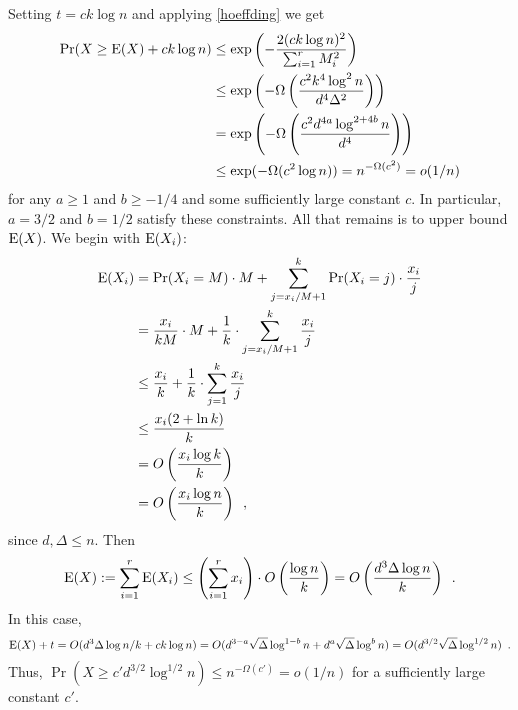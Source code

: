 \documentclass{patmorin}
\begin{document}

Setting $t=ck\log n$ and applying \cref{hoeffding} we get
\begin{align*}
  \Pr(X\ge \mathrm{E}(X) + ck\log n)
  & \le \exp\left(-\frac{2(ck\log n)^2}{\sum_{i=1}^r M_i^2}\right) \\
  & \le \exp\left(-\Omega\left(\frac{c^2k^4\log^2 n}{d^4\Delta^2}\right)\right) \\
  & = \exp\left(-\Omega\left(\frac{c^2d^{4a}\log^{2+4b} n}{d^4}\right)\right) \\
  & \le \exp(-\Omega(c^2\log n)) = n^{-\Omega(c^2)} = o(1/n)
\end{align*}
for any $a\ge 1$ and $b\ge -1/4$ and some sufficiently large constant $c$.  In particular, $a=3/2$ and $b=1/2$ satisfy these constraints.  All that remains is to upper bound $\mathrm{E}(X)$.  We begin with $\mathrm{E}(X_i)$:
\begin{align*}
  \mathrm{E}(X_i)
  & =\Pr(X_i=M)\cdot M + \sum_{j=x_i/M+1}^k \Pr(X_i=j)\cdot\frac{x_i}{j} \\
  & =\frac{x_i}{kM}\cdot M + \frac{1}{k}\cdot\sum_{j=x_i/M+1}^k \frac{x_i}{j} \\
  & \le \frac{x_i}{k} + \frac{1}{k}\cdot\sum_{j=1}^k \frac{x_i}{j} \\
  & \le \frac{x_i(2+\ln k)}{k} \\
  & = O\left(\frac{x_i\log k}{k}\right) \\
  & = O\left(\frac{x_i\log n}{k}\right)
  \enspace ,
\end{align*}
since $d,\Delta\le n$.  Then
\[
  \mathrm{E}(X) := \sum_{i=1}^r\mathrm{E}(X_i) \le \left(\sum_{i=1}^r x_i\right)\cdot O\left(\frac{\log n}{k}\right) = O\left(\frac{d^3\Delta\log n}{k}\right)
   \enspace .
\]
In this case,
\[
  \mathrm{E}(X)+t = O(d^3\Delta\log n/k + ck\log n)
  = O(d^{3-a}\sqrt{\Delta}\log^{1-b} n + d^a\sqrt{\Delta}\log^{b} n)
  = O(d^{3/2}\sqrt{\Delta}\log^{1/2}n) \enspace .
\]
Thus, $\Pr(X\ge c'd^{3/2}\log^{1/2} n) \le n^{-\Omega(c')}=o(1/n)$ for a sufficiently large constant $c'$.
%
\end{document}
